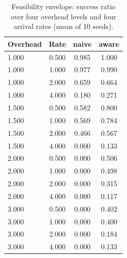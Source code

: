\begin{table}[t]
\centering
\small
\caption{Feasibility envelope: success ratio over four overhead levels and four arrival rates (mean of 10 seeds).}
\label{tab:p2-envelope}
\begin{tabular}{lccc}
\toprule
Overhead & Rate & naive & aware \\
\midrule
1.000 & 0.500 & 0.985 & 1.000 \\
1.000 & 1.000 & 0.977 & 0.990 \\
1.000 & 2.000 & 0.659 & 0.664 \\
1.000 & 4.000 & 0.180 & 0.271 \\
1.500 & 0.500 & 0.582 & 0.800 \\
1.500 & 1.000 & 0.569 & 0.784 \\
1.500 & 2.000 & 0.466 & 0.567 \\
1.500 & 4.000 & 0.000 & 0.133 \\
2.000 & 0.500 & 0.000 & 0.506 \\
2.000 & 1.000 & 0.000 & 0.498 \\
2.000 & 2.000 & 0.000 & 0.315 \\
2.000 & 4.000 & 0.000 & 0.117 \\
3.000 & 0.500 & 0.000 & 0.402 \\
3.000 & 1.000 & 0.000 & 0.400 \\
3.000 & 2.000 & 0.000 & 0.184 \\
3.000 & 4.000 & 0.000 & 0.133 \\
\bottomrule
\end{tabular}
\par\vspace{2pt}{\footnotesize\raggedright The naive policy serves nothing from 2x overhead upward, at any arrival rate.\par}
\end{table}
